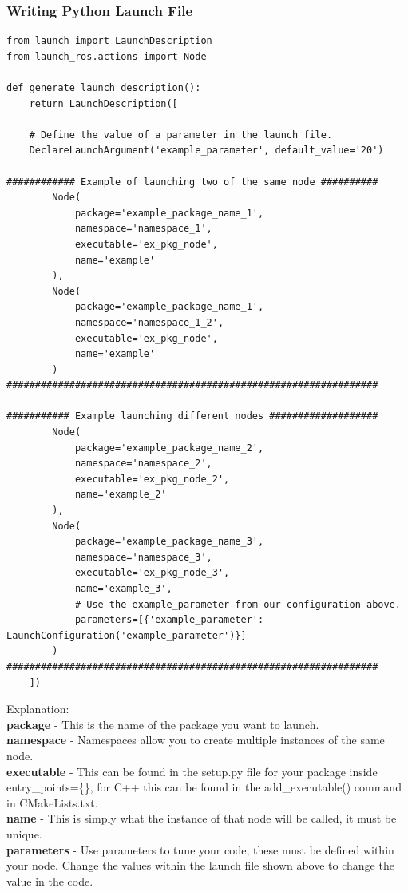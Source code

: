 \documentclass[11pt]{article}
\begin{document}
\subsubsection{Writing Python Launch File}
\lstset{language=python}
\begin{lstlisting}
from launch import LaunchDescription
from launch_ros.actions import Node

def generate_launch_description():
    return LaunchDescription([    
    
    # Define the value of a parameter in the launch file.
    DeclareLaunchArgument('example_parameter', default_value='20') 
    
############ Example of launching two of the same node ##########        
        Node(
            package='example_package_name_1',
            namespace='namespace_1',
            executable='ex_pkg_node',
            name='example'
        ),
        Node(
            package='example_package_name_1',
            namespace='namespace_1_2',
            executable='ex_pkg_node',
            name='example'
        )
#################################################################

########### Example launching different nodes ###################
		Node(
            package='example_package_name_2',
            namespace='namespace_2',
            executable='ex_pkg_node_2',
            name='example_2'
        ),
        Node(
            package='example_package_name_3',
            namespace='namespace_3',
            executable='ex_pkg_node_3',
            name='example_3',
            # Use the example_parameter from our configuration above.
            parameters=[{'example_parameter': LaunchConfiguration('example_parameter')}] 
        )
#################################################################
    ])
\end{lstlisting}
Explanation:\\
\textbf{package} - This is the name of the package you want to launch.\\
\textbf{namespace} - Namespaces allow you to create multiple instances of the same node.\\
\textbf{executable }- This can be found in the setup.py file for your package inside entry\_points=\{\}, for C++ this can be found in the add\_executable() command in CMakeLists.txt.\\
\textbf{name} - This is simply what the instance of that node will be called, it must be unique.\\
\textbf{parameters} - Use parameters to tune your code, these must be defined within your node. Change the values within the launch file shown above to change the value in the code.\\
\end{document}
